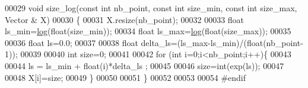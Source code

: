 \begin{DoxyCode}
00029 \textcolor{keywordtype}{void} size\_log(\textcolor{keyword}{const} \textcolor{keywordtype}{int} nb\_point, \textcolor{keyword}{const} \textcolor{keywordtype}{int} size\_min, \textcolor{keyword}{const} \textcolor{keywordtype}{int} size\_max, Vector & X)
00030 \{
00031   X.resize(nb\_point);
00032 
00033   \textcolor{keywordtype}{float} ls\_min=\hyperlink{structlog}{log}(\textcolor{keywordtype}{float}(size\_min));
00034   \textcolor{keywordtype}{float} ls\_max=\hyperlink{structlog}{log}(\textcolor{keywordtype}{float}(size\_max));
00035 
00036   \textcolor{keywordtype}{float} ls=0.0;
00037 
00038   \textcolor{keywordtype}{float} delta\_ls=(ls\_max-ls\_min)/(\textcolor{keywordtype}{float}(nb\_point-1));
00039 
00040   \textcolor{keywordtype}{int} size=0;
00041 
00042   \textcolor{keywordflow}{for} (\textcolor{keywordtype}{int} i=0;i<nb\_point;i++)\{
00043 
00044     ls = ls\_min + float(i)*delta\_ls ;
00045     
00046     size=int(exp(ls)); 
00047 
00048     X[i]=size;
00049   \}
00050 
00051 \}
00052 
00053 
00054 \textcolor{preprocessor}{#endif}
\end{DoxyCode}
